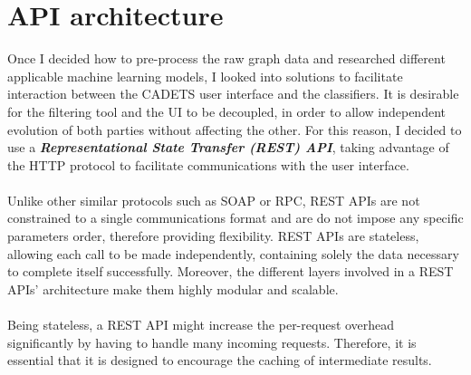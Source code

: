 	\section{API architecture} \label{Section 2.3}
	Once I decided how to pre-process the raw graph data and researched different applicable machine learning models, I looked into solutions to facilitate interaction between the CADETS user interface and the classifiers. It is desirable for the filtering tool and the UI to be decoupled, in order to allow independent evolution of both parties without affecting the other. For this reason, I decided to use a \textit{\textbf{Representational State Transfer (REST) API}}, taking advantage of the HTTP protocol to facilitate communications with the user interface.
	\\ \\
	Unlike other similar protocols such as SOAP or RPC, REST APIs are not constrained to a single communications format and are do not impose any specific parameters order, therefore providing flexibility. REST APIs are stateless, allowing each call to be made independently, containing solely the data necessary to complete itself successfully. Moreover, the different layers involved in a REST APIs' architecture make them highly modular and scalable. 
	\\ \\
	Being stateless, a REST API might increase the per-request overhead significantly by having to handle many incoming requests. Therefore, it is essential that it is designed to encourage the caching of intermediate results.
	
